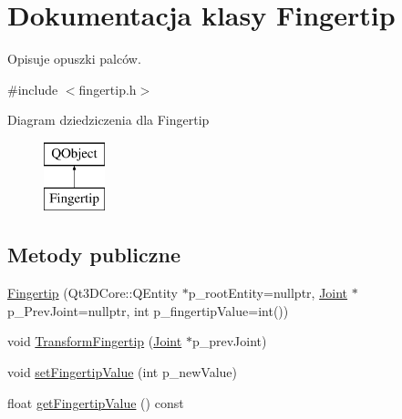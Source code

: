 \hypertarget{class_fingertip}{}\section{Dokumentacja klasy Fingertip}
\label{class_fingertip}


Opisuje opuszki palców.  




{\ttfamily \#include $<$fingertip.\+h$>$}

Diagram dziedziczenia dla Fingertip\begin{figure}[H]
\begin{center}
\leavevmode
\includegraphics[height=2.000000cm]{class_fingertip}
\end{center}
\end{figure}
\subsection*{Metody publiczne}
\begin{DoxyCompactItemize}
\item 
\hyperlink{class_fingertip_a532cc6d9478ba3e1e0d8024ad7773141}{Fingertip} (Qt3\+D\+Core\+::\+Q\+Entity $\ast$p\+\_\+root\+Entity=nullptr, \hyperlink{class_joint}{Joint} $\ast$p\+\_\+\+Prev\+Joint=nullptr, int p\+\_\+fingertip\+Value=int())
\item 
void \hyperlink{class_fingertip_aeecbae45b84b2ab9840df15b6541a21d}{Transform\+Fingertip} (\hyperlink{class_joint}{Joint} $\ast$p\+\_\+prev\+Joint)
\item 
void \hyperlink{class_fingertip_aa2823945458eb8a97f9568934bfcc1d5}{set\+Fingertip\+Value} (int p\+\_\+new\+Value)
\item 
float \hyperlink{class_fingertip_a3ec55016e28f9fbce847baa668c44868}{get\+Fingertip\+Value} () const
\end{DoxyCompactItemize}
